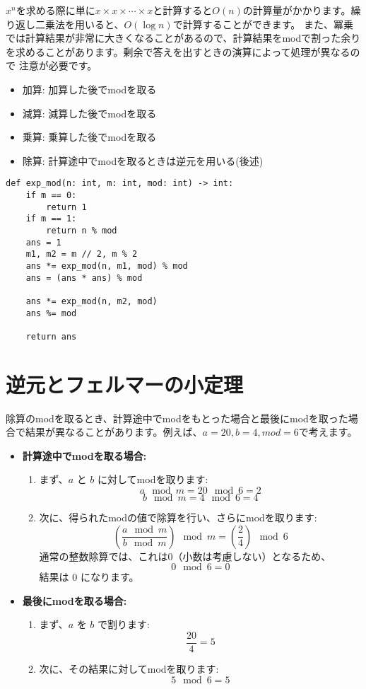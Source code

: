 \documentclass{jlreq}
\begin{document}
$x^n$を求める際に単に$x \times x \times \cdots \times x$と計算すると$O(n)$の計算量がかかります。繰り返し二乗法を用いると、$O(\log n)$で計算することができます。
また、冪乗では計算結果が非常に大きくなることがあるので、計算結果をmodで割った余りを求めることがあります。剰余で答えを出すときの演算によって処理が異なるので
注意が必要です。

\begin{itemize}
    \item 加算: 加算した後でmodを取る
    \item 減算: 減算した後でmodを取る
    \item 乗算: 乗算した後でmodを取る
    \item 除算: 計算途中でmodを取るときは逆元を用いる(後述)
\end{itemize}

\begin{lstlisting}[caption=繰り返し二乗法の実装, label=power, frame=TRBL]
def exp_mod(n: int, m: int, mod: int) -> int:
    if m == 0:
        return 1
    if m == 1:
        return n % mod
    ans = 1
    m1, m2 = m // 2, m % 2
    ans *= exp_mod(n, m1, mod) % mod
    ans = (ans * ans) % mod
    
    ans *= exp_mod(n, m2, mod)
    ans %= mod
    
    return ans
\end{lstlisting}

\section{逆元とフェルマーの小定理}

除算のmodを取るとき、計算途中でmodをもとった場合と最後にmodを取った場合で結果が異なることがあります。例えば、$a = 20, b = 4, mod = 6$で考えます。

\begin{itemize}
    \item \textbf{計算途中でmodを取る場合:}
    \begin{enumerate}
        \item まず、\( a \) と \( b \) に対してmodを取ります:
        \[
        a \mod m = 20 \mod 6 = 2
        \]
        \[
        b \mod m = 4 \mod 6 = 4
        \]
        \item 次に、得られたmodの値で除算を行い、さらにmodを取ります:
        \[
        \left(\frac{a \mod m}{b \mod m}\right) \mod m = \left(\frac{2}{4}\right) \mod 6
        \]
        通常の整数除算では、これは0（小数は考慮しない）となるため、
        \[
        0 \mod 6 = 0
        \]
        結果は \( 0 \) になります。
    \end{enumerate}

    \item \textbf{最後にmodを取る場合:}
    \begin{enumerate}
        \item まず、\( a \) を \( b \) で割ります:
        \[
        \frac{20}{4} = 5
        \]
        \item 次に、その結果に対してmodを取ります:
        \[
        5 \mod 6 = 5
        \]
    \end{enumerate}
\end{itemize}
\end{document}
